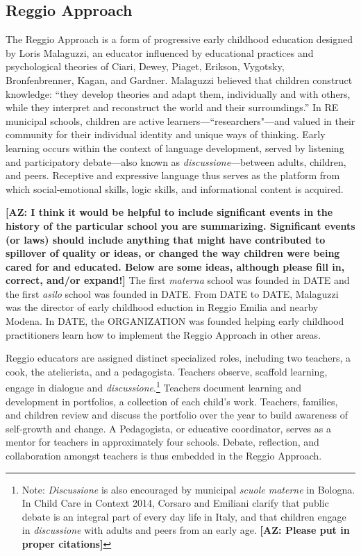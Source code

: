 
\subsection{Reggio Approach}

The Reggio Approach is a form of progressive early childhood education designed by Loris Malaguzzi, an educator influenced by educational practices and psychological theories of Ciari, Dewey, Piaget, Erikson, Vygotsky, Bronfenbrenner, Kagan, and Gardner. Malaguzzi believed that children construct knowledge: ``they develop theories and adapt them, individually and with others, while they interpret and reconstruct the world and their surroundings.'' In RE municipal schools, children are active learners---``researchers"---and valued in their community for their individual identity and unique ways of thinking. Early learning occurs within the context of language development, served by listening and participatory debate---also known as \textit{discussione}---between adults, children, and peers. Receptive and expressive language thus serves as the platform from which social-emotional skills, logic skills, and informational content is acquired. 

\textbf{[AZ: I think it would be helpful to include significant events in the history of the particular school you are summarizing. Significant events (or laws) should include anything that might have contributed to spillover of quality or ideas, or changed the way children were being cared for and educated. Below are some ideas, although please fill in, correct, and/or expand!]}
The first \textit{materna} school was founded in DATE and the first \textit{asilo} school was founded in DATE. From DATE to DATE, Malaguzzi was the director of early childhood eduction in Reggio Emilia and nearby Modena. In DATE, the ORGANIZATION was founded helping early childhood practitioners learn how to implement the Reggio Approach in other areas.

Reggio educators are assigned distinct specialized roles, including two teachers, a cook, the atelierista, and a pedagogista. Teachers observe, scaffold learning, engage in dialogue and \textit{discussione}.\footnote{Note: \textit{Discussione} is also encouraged by municipal \textit{scuole materne} in Bologna. In Child Care in Context 2014, Corsaro and Emiliani clarify that public debate is an integral part of every day life in Italy, and that children engage in \textit{discussione} with adults and peers from an early age. \textbf{[AZ: Please put in proper citations]}}  Teachers  document learning and development in portfolios, a collection of each child's work. Teachers, families, and children review and discuss the portfolio over the year to build awareness of self-growth and change. A Pedagogista, or educative coordinator, serves as a mentor for teachers in approximately four schools. Debate, reflection, and collaboration amongst teachers is thus embedded in the Reggio Approach.

